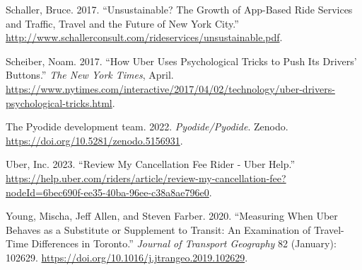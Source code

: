 \documentclass[
  letterpaper,
  DIV=11,
  numbers=noendperiod]{scrartcl}
\newlength{\cslhangindent}
\newlength{\cslentryspacingunit} %
\newenvironment{CSLReferences}[2] %
 {%
  \setlength{\parindent}{0pt}
  \ifodd #1
  \let\oldpar\par
  \def\par{\hangindent=\cslhangindent\oldpar}
  \fi
  \setlength{\parskip}{#2\cslentryspacingunit}
 }%
 {}
\begin{document}
\begin{CSLReferences}{1}{0}
\leavevmode{}%
Schaller, Bruce. 2017. {``Unsustainable? The Growth of App-Based Ride
Services and Traffic, Travel and the Future of New York City.''}
\url{http://www.schallerconsult.com/rideservices/unsustainable.pdf}.

\leavevmode{}%
Scheiber, Noam. 2017. {``How Uber Uses Psychological Tricks to Push Its
Drivers{'} Buttons.''} \emph{The New York Times}, April.
\url{https://www.nytimes.com/interactive/2017/04/02/technology/uber-drivers-psychological-tricks.html}.

\leavevmode{}%
The Pyodide development team. 2022. \emph{Pyodide/Pyodide}. Zenodo.
\url{https://doi.org/10.5281/zenodo.5156931}.

\leavevmode{}%
Uber, Inc. 2023. {``Review My Cancellation Fee \textbar{} Rider - Uber
Help.''}
\url{https://help.uber.com/riders/article/review-my-cancellation-fee?nodeId=6bec690f-ee35-40ba-96ee-c38a8ae796e0}.

\leavevmode{}%
Young, Mischa, Jeff Allen, and Steven Farber. 2020. {``Measuring When
Uber Behaves as a Substitute or Supplement to Transit: An Examination of
Travel-Time Differences in Toronto.''} \emph{Journal of Transport
Geography} 82 (January): 102629.
\url{https://doi.org/10.1016/j.jtrangeo.2019.102629}.

\end{CSLReferences}
\end{document}
